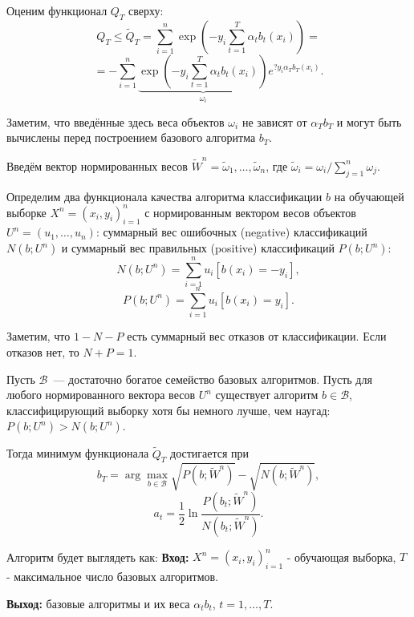 \documentclass{article}
\renewcommand{\leq}{\leqslant}
\theoremstyle{definition}
\theoremstyle{theorem}
\theoremstyle{remark}
\theoremstyle{theorem}
\theoremstyle{example}
\theoremstyle{theorem}
\theoremstyle{theorem}
\theoremstyle{theorem}
\theoremstyle{theorem}
\begin{document}
Оценим функционал $Q_T$ сверху:
\begin{equation*}
	Q_T \leq \widetilde {Q}_T =\sum_{i=1}^{n} \exp \left(-y_i \sum_{t=1}^{T} \alpha_t b_t(x_i) \right) =
\end{equation*}
\begin{equation*}
	= -\sum_{i=1}^{n}  \underbrace{\exp \left(-y_i \sum_{t=1}^{T} \alpha_t b_t(x_i) \right)}_{\omega_i} e^{?y_i\alpha_T b_T(x_i)}.
\end{equation*}

Заметим, что введённые здесь веса объектов $\omega_i$ не зависят от $\alpha_T b_T$ и могут быть вычислены перед построением базового алгоритма $b_T$.

Введём вектор нормированных весов $\widetilde W^n = \widetilde{\omega}_1, \ldots, \widetilde{\omega}_n$, где $\widetilde{\omega}_i = \omega_i / \sum_{j=1}^{n} \omega_j$.
\vspace{0.2cm}

Определим два функционала качества алгоритма классификации $b$ на обучающей выборке  $X^n = (x_i,y_i)_{i=1}^n$ с нормированным вектором весов объектов $U^n = (u_1, \ldots , u_n)$: суммарный вес ошибочных (negative) классификаций $N(b; U^n)$ и суммарный вес правильных (positive) классификаций $P(b; U^n)$:
$$N(b; U^n) = \sum_{i=1}^{n} u_i [b(x_i)=-y_i],$$
$$P(b; U^n) = \sum_{i=1}^{n} u_i [b(x_i)=y_i].$$

Заметим, что $1 - N - P$ есть суммарный вес отказов от классификации. Если
отказов нет, то $N + P = 1$.   

\begin{center}
	Пусть $\mathcal{B}$~--- достаточно богатое семейство базовых алгоритмов.
	Пусть для любого нормированного вектора весов $U^n$ существует алгоритм $b \in \mathcal{B}$, классифицирующий выборку хотя бы немного лучше, чем наугад: $P(b; U^n)>N(b; U^n)$.
	
	
	Тогда минимум функционала $\widetilde {Q}_T$ достигается при
	$$b_T = \arg \max \limits_{b \in \mathcal{B}} \sqrt{P(b; \widetilde{W}^n)}-\sqrt{N(b; \widetilde {W}^n)},$$
	$$a_t = \frac{1}{2} \ln \frac{P(b_t; \widetilde{W}^n)}{N(b_t; \widetilde{W}^n)}.$$
\end{center}

Алгоритм будет выглядеть как:
\textbf{Вход:} $X^n = (x_i,y_i)_{i=1}^n$ - обучающая выборка, $T$ - максимальное число базовых алгоритмов.
\vspace{0.2cm}

\textbf{Выход:} базовые алгоритмы и их веса $\alpha_t b_t$, $t = 1, \ldots, T$.
\vspace{0.2cm}
\end{document}
